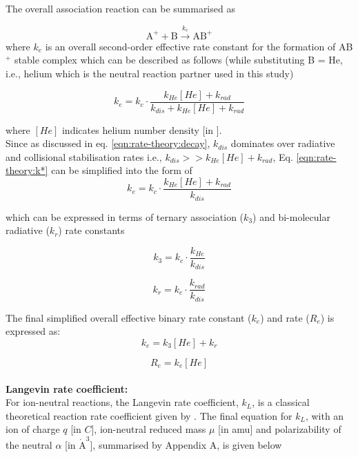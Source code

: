 The overall association reaction can be summarised as 

\[ \text{A}^+ + \text{B} \xrightarrow{k_{e}} \text{AB}^+ \]
where $k_{e}$ is an overall second-order effective rate constant for the formation of AB$^+$ stable complex which can be described as follows (while substituting B = He, i.e., helium which is the neutral reaction partner used in this study)

\begin{equation}
    k_{e} = k_c \cdot \frac{k_{He}[He] + k_{rad}}{k_{dis} + k_{He}[He] + k_{rad}} 
    \label{eqn:rate-theory:k*}
\end{equation}

where $[He]$ indicates helium number density [in \percc].\\

Since as discussed in eq. \ref{eqn:rate-theory:decay}, $k_{dis}$ dominates over radiative and collisional stabilisation rates i.e., $k_{dis} >> k_{He}[He] + k_{rad}$, Eq. \ref{eqn:rate-theory:k*} can be simplified into the form of 
\[ k_{e} = k_c \cdot \frac{k_{He}[He] + k_{rad}}{k_{dis}} \]

which can be expressed in terms of ternary association ($k_3$) and bi-molecular radiative ($k_r$) rate constants 

\begin{equation}
    k_3 = k_c \cdot \frac{k_{He}}{k_{dis}}
    \label{eqn:rate-theory:k3}
\end{equation}

\begin{equation}
    k_r = k_c \cdot \frac{k_{rad}}{k_{dis}}
    \label{eqn:rate-theory:kr}
\end{equation}

The final simplified overall effective binary rate constant ($k_{e}$) and rate ($R_{e}$) is expressed as:
\begin{equation}
    k_{e} = k_3[He] + k_r
    \label{eqn:rate-theory:k*-simplified}
\end{equation}

\begin{equation}
    R_{e} = k_{e}[He]
    \label{eqn:rate-theory:R*-simplified}
\end{equation}
\\
\textbf{Langevin rate coefficient:}\\
For ion-neutral reactions, the Langevin rate coefficient, $k_L$, is a classical theoretical reaction rate coefficient given by \citet{langevin_notitle_1905}.  The final equation for $k_L$, with an ion of charge $q$ [in $C$], ion-neutral reduced mass $\mu$ [in amu] and polarizability of the neutral $\alpha$ [in $\mathring{\text{A}}^3$], summarised by \citet{asvany_numerical_2009} Appendix A, is given below
\label{discussions:Langevin}

